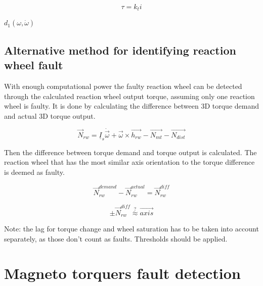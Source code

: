 \begin{equation}
\tau = k_t i
\end{equation}

$d_1(\omega, \dot{\omega})$


\subsection{Alternative method for identifying reaction wheel fault}

With enough computational power the faulty reaction wheel can be detected through the calculated reaction wheel output torque, assuming only one reaction wheel is faulty. It is done by calculating the difference between 3D torque demand and actual 3D torque output. 

\begin{equation}
\vec{N}_{rw} = \underline{I}_s \dot{\vec{\omega}}  + \vec{\omega} \times \vec{h_{rw}} - \vec{N_{mt}} - \vec{N_{dist}}
\end{equation}

Then the difference between torque demand and torque output is calculated. The reaction wheel that has the most similar axis orientation to the torque difference is deemed as faulty.

\begin{equation}
\vec{N}_{rw}^{demand} - \vec{N}_{rw}^{actual} = 
\vec{N}_{rw}^{diff}
\end{equation}

\begin{equation}
\pm \vec{N}_{rw}^{diff}  \stackrel{?}{\approx} \vec{axis} 
\end{equation}



Note: the lag for torque change and wheel saturation has to be taken into account separately, as those don't count as faults. 
Thresholds should be applied.

\section{Magneto torquers  fault detection}
